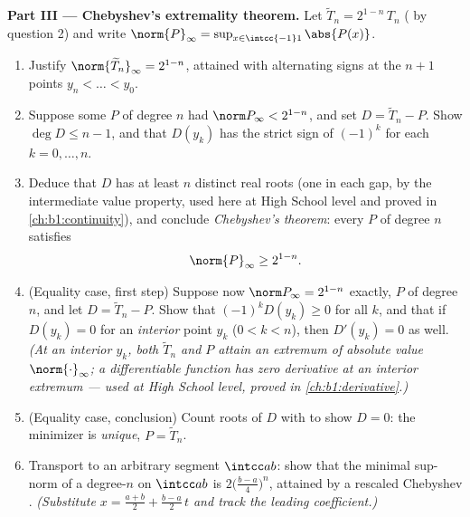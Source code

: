 \begin{problem}
\medskip
\noindent\textbf{Part III --- Chebyshev's extremality theorem.}
Let $\widetilde T_n = 2^{1-n}\,T_n$ ( by question 2) and
write $\norm{P}_\infty = \sup_{x \in \intcc{-1}1}\abs{P(x)}$.
\begin{enumerate}[resume]
  \item Justify $\norm{\widetilde T_n}_\infty = 2^{1-n}$, attained
        with alternating signs at the $n + 1$ points $y_n < \dots
        < y_0$.
  \item Suppose some  $P$ of degree $n$ had
        $\norm P_\infty < 2^{1-n}$, and set $D = \widetilde T_n -
        P$. Show $\deg D \leq n - 1$, and that $D(y_k)$ has the
        strict sign of $(-1)^k$ for each $k = 0, \dots, n$.
  \item Deduce that $D$ has at least $n$ distinct real roots (one
        in each gap, by the intermediate value property, used
        here at High School level and proved in
        \cref{ch:b1:continuity}), and conclude \emph{Chebyshev's
        theorem}: every  $P$ of degree $n$ satisfies
        \[
        \norm{P}_\infty \geq 2^{1-n} .
        \]
  \item (Equality case, first step) Suppose now $\norm P_\infty =
        2^{1-n}$ exactly, $P$  of degree $n$, and let $D =
        \widetilde T_n - P$. Show that $(-1)^kD(y_k) \geq 0$ for
        all $k$, and that if $D(y_k) = 0$ for an \emph{interior}
        point $y_k$ ($0 < k < n$), then $D'(y_k) = 0$ as well.
        \emph{(At an interior $y_k$, both $\widetilde T_n$ and
        $P$ attain an extremum of absolute value $\norm{\cdot}
        _\infty$; a differentiable function has zero derivative
        at an interior extremum --- used at High School level,
        proved in \cref{ch:b1:derivative}.)}
  \item (Equality case, conclusion) Count roots of $D$ with
         to show $D = 0$: the minimizer is
        \emph{unique}, $P = \widetilde T_n$.
  \item Transport to an arbitrary segment $\intcc ab$: show that
        the minimal sup-norm of a  degree-$n$  on
        $\intcc ab$ is $2\bigl(\frac{b-a}4\bigr)^n$, attained by a
        rescaled Chebyshev . \emph{(Substitute $x =
        \frac{a+b}2 + \frac{b-a}2\,t$ and track the leading
        coefficient.)}
\end{enumerate}


\end{problem}

